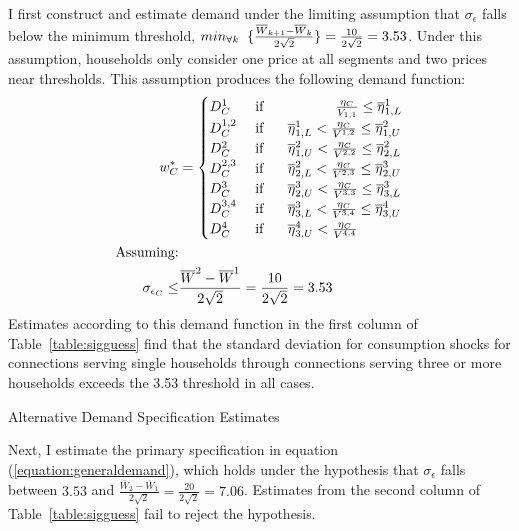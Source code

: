 \documentclass[12pt]{article}
\begin{document}
\begin{appendices}
I first construct and estimate demand under the limiting assumption that $\sigma_{\epsilon}$ falls below the minimum threshold, $min_{\forall k}\hspace{.2cm} \{ \frac{\overline{W}_{k+1} - \overline{W}_k}{2\sqrt{2}} \} = \frac{10}{2\sqrt{2}} = 3.53$.  Under this assumption, households only consider one price at all segments and two prices near thresholds.  This assumption produces the following demand function:
\begin{align}\label{equation:demandalt1}
\begin{split}
w^{*}_C &=
\begin{cases}
D^{1}_C   & \text{ if } \hspace{1.7cm}   \frac{ \eta_C }{ V_{1,1} }  \leq \overline{\eta}^{1}_{1,L}  \\
D^{1,2}_C   & \text{ if } \hspace{.5cm} \overline{\eta}^{1}_{1,L} <    \frac{ \eta_C }{ V^{1,2} }    \leq \overline{\eta}^{2}_{1,U}  \\
D^{2}_C   & \text{ if } \hspace{.5cm} \overline{\eta}^{2}_{1,U} <    \frac{ \eta_C }{ V^{2,2} }    \leq \overline{\eta}^{2}_{2,L}  \\
D^{2,3}_C   & \text{ if } \hspace{.5cm} \overline{\eta}^{2}_{2,L} <    \frac{ \eta_C }{ V^{2,3} }    \leq \overline{\eta}^{3}_{2,U}  \\ 
D^{3}_C   & \text{ if } \hspace{.5cm} \overline{\eta}^{3}_{2,U} <    \frac{ \eta_C }{ V^{3,3} }    \leq \overline{\eta}^{3}_{3,L}  \\ 
D^{3,4}_C   & \text{ if } \hspace{.5cm} \overline{\eta}^{3}_{3,L} <    \frac{ \eta_C }{ V^{3,4} }    \leq \overline{\eta}^{4}_{3,U}  \\ 
D^{4}_C   & \text{ if } \hspace{.5cm} \overline{\eta}^{4}_{3,U} <    \frac{ \eta_C }{ V^{4,4} }   
\end{cases}\\
\text{Assuming:}\\
 \sigma_{\epsilon_C} \leq &\frac{  \overline{W}^{2} - \overline{W}^{1} }{ 2\sqrt{2} } = \frac{ 10 }{ 2 \sqrt{2} } = 3.53 
\end{split}
\end{align}
Estimates according to this demand function in the first column of Table~\ref{table:sigguess} find that the standard deviation for consumption shocks for connections serving single households through connections serving three or more households exceeds the 3.53 threshold in all cases.
\begin{table}
\centering
\caption{Alternative Demand Specification Estimates}\label{table:sigguess}

\end{table}
Next, I estimate the primary specification in equation (\ref{equation:generaldemand}), which holds under the hypothesis that $\sigma_{\epsilon}$ falls between $3.53$ and $\frac{\overline{W}_{2} - \overline{W}_1}{2\sqrt{2}} = \frac{20}{2\sqrt{2}} = 7.06$.  Estimates from the second column of Table~\ref{table:sigguess} fail to reject the hypothesis. 


\end{appendices}
\end{document}
